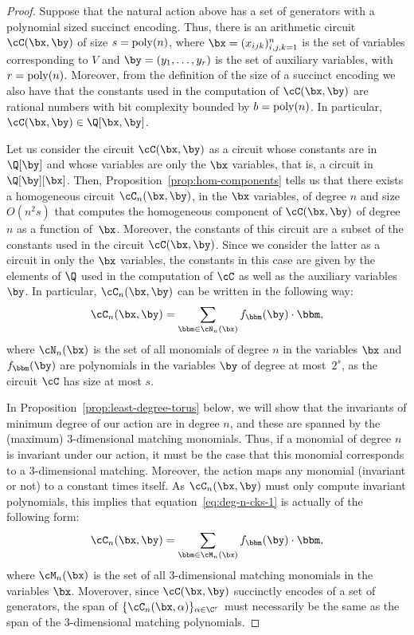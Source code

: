 \begin{proof}
	Suppose that the natural action above has a set of generators with
	a polynomial sized succinct encoding. Thus, there is an arithmetic
	circuit $\cC(\bx, \by)$ of size $s = {\rm poly}(n)$, where
	$\bx = (x_{ijk})_{i,j,k=1}^n$ is the set of variables corresponding
	to $V$ and $\by = (y_1, \ldots, y_r)$ is the set of auxiliary
	variables, with $r = {\rm poly}(n)$.
	Moreover, from the definition of the size of a succinct encoding we also have that the
	constants used in the computation of $\cC(\bx, \by)$ are rational numbers with bit
	complexity bounded by $b = {\rm poly}(n)$. In particular, $\cC(\bx, \by) \in \Q[\bx,\by]$.

	Let us consider the circuit $\cC(\bx, \by)$ as a circuit whose constants
	are in $\Q[\by]$ and whose variables are only the $\bx$ variables,
	that is, a circuit in $\Q[\by][\bx]$.
  Then, Proposition~\ref{prop:hom-components}
	tells us that there exists a homogeneous circuit $\cC_n(\bx, \by)$,
	in the $\bx$ variables, of degree $n$ and size $O(n^2 s)$ that computes the homogeneous component of $\cC(\bx,\by)$ of degree $n$ as a function of~$\bx$.
  Moreover, the constants of this circuit are a subset of the constants used in the circuit $\cC(\bx, \by)$.
  Since we consider the latter as a circuit in only the $\bx$ variables, the constants in this case are given by the elements of $\Q$ used in the computation of
  $\cC$ as well as the auxiliary variables $\by$.
  In particular, $\cC_n(\bx, \by)$ can be written in the following way:
	\begin{equation}\label{eq:deg-n-cks-1}
		\cC_n(\bx, \by) = \sum_{\bbm \in \cN_n(\bx)} f_\bbm(\by) \cdot \bbm,
	\end{equation}
	where $\cN_n(\bx)$ is the set of all monomials of degree $n$ in the
	variables $\bx$ and $f_\bbm(\by)$ are polynomials in the variables $\by$ of
	degree at most~$2^s$, as the circuit $\cC$ has size at most $s$.

	In Proposition~\ref{prop:least-degree-torus} below, we will show that the invariants
	of minimum degree of our action are in degree $n$, and these
	are spanned by the (maximum) $3$-dimensional matching monomials.
  Thus, if a monomial of degree $n$ is invariant under our action, it must be the case that this monomial corresponds to a $3$-dimensional matching.
  Moreover, the action maps any monomial (invariant or not) to a constant times itself. 
  As $\cC_n(\bx, \by)$ must only compute invariant polynomials, this
	implies that equation~\eqref{eq:deg-n-cks-1} is actually of the following form:
	\begin{equation}\label{eq:deg-n-cks-2}
		\cC_n(\bx, \by) = \sum_{\bbm \in \cM_n(\bx)}
		f_\bbm(\by) \cdot \bbm,
	\end{equation}
	where $\cM_n(\bx)$ is the set of all $3$-dimensional matching monomials
	in the variables $\bx$.
  Moverover, since $\cC(\bx,\by)$ succinctly encodes of a set of generators, the span of $\{\cC_n(\bx,\alpha)\}_{\alpha\in\C^r}$ must necessarily be the same as the span of the 3-dimensional matching polynomials.


\end{proof}
